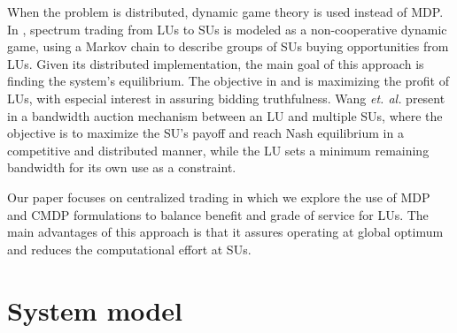 When the problem is distributed, dynamic game theory is used instead of MDP.
In \cite{ref:Niyato}, spectrum trading from LUs to SUs is modeled as a non-cooperative dynamic game, using a Markov chain to describe groups of SUs buying opportunities from LUs. Given its distributed implementation, the main goal of this approach is finding the system's equilibrium. The objective in \cite{ref:eBay} and \cite{ref:Jia} is maximizing the profit of LUs, with especial interest in assuring bidding truthfulness. Wang \textit{et. al.} present in \cite{ref:Wang} a bandwidth auction mechanism between an LU and multiple SUs, where the objective is to maximize the SU's payoff and reach Nash equilibrium in a competitive and distributed manner, while the LU sets a minimum remaining bandwidth for its own use as a constraint. 
 


Our paper focuses on centralized trading in which we explore the use of MDP and CMDP formulations to balance benefit and grade of service for LUs. The main advantages of this approach is that it assures operating at global optimum and reduces the computational effort at SUs.

\section{System model}\label{Sarnoff_sec_model}

